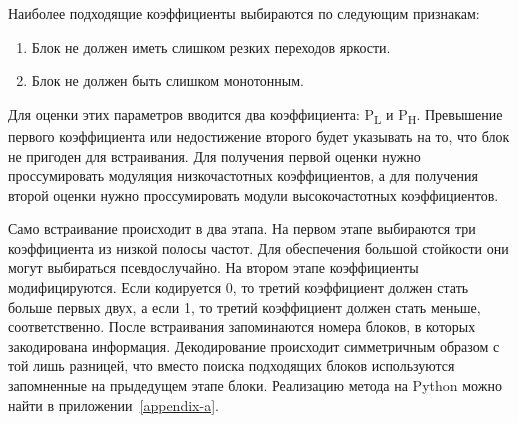 Наиболее подходящие коэффициенты выбираются по следующим признакам:
\begin{enumerate}
    \item Блок не должен иметь слишком резких переходов яркости.
    \item Блок не должен быть слишком монотонным.
\end{enumerate}
Для оценки этих параметров вводится два коэффициента: P\textsubscript{L} и P\textsubscript{H}.
Превышение первого коэффициента или недостижение второго будет указывать на то,
что блок не пригоден для встраивания. Для получения первой оценки нужно проссумировать модуляция
низкочастотных коэффициентов, а для получения второй оценки нужно проссумировать модули высокочастотных
коэффициентов.

Само встраивание происходит в два этапа.
На первом этапе выбираются три коэффициента из низкой полосы частот.
Для обеспечения большой стойкости они могут выбираться псевдослучайно.
На втором этапе коэффициенты модифицируются. Если кодируется 0,
то третий коэффициент должен стать больше первых двух, а если 1,
то третий коэффициент должен стать меньше, соответственно.
После встраивания запоминаются номера блоков, в которых закодирована информация.
Декодирование происходит симметричным образом с той лишь разницей,
что вместо поиска подходящих блоков используются запомненные на прыдедущем этапе блоки.
Реализацию метода на Python можно найти в приложении~\ref{appendix-a}.
